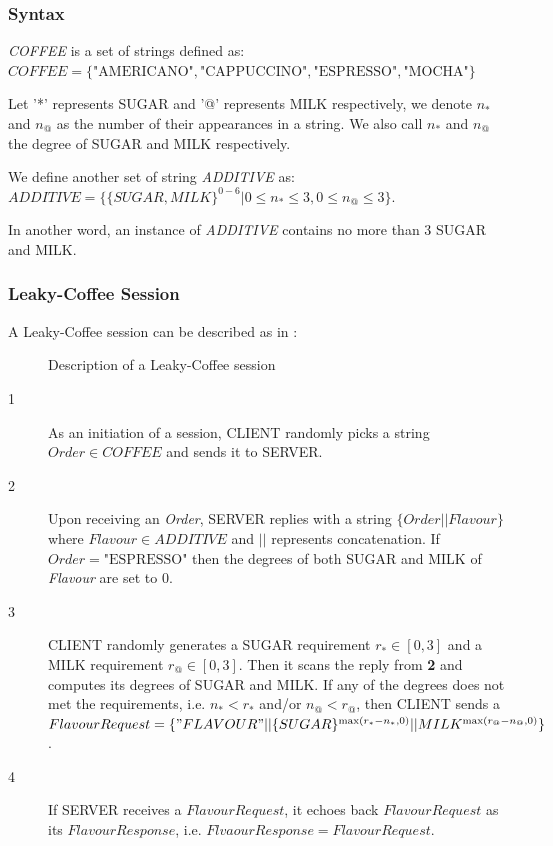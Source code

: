 \subsubsection{Syntax}
\begin{definition}
\textit{COFFEE} is a set of strings defined as:\\
 $COFFEE = \{  {\text{"AMERICANO"}}, \text{"CAPPUCCINO"}, \text{"ESPRESSO"}, \text{"MOCHA"}\}$
\end{definition}

\begin{definition}
Let '*' represents SUGAR and '@' represents MILK respectively, we denote $n_*$ and $n_@$ as the number of their appearances in a string. We also call $n_*$ and $n_@$ the degree of SUGAR and MILK respectively.
\end{definition}

\begin{definition}
We define another set of string \textit{ADDITIVE} as:\\
$ADDITIVE = \{\{ SUGAR, MILK \}^{0 - 6} | 0 \leq n_{*} \leq 3, 0 \leq n_{@} \leq 3 \}$.

In another word, an instance of \textit{ADDITIVE} contains no more than 3 SUGAR and MILK.
\end{definition}

\subsubsection{Leaky-Coffee Session}
A Leaky-Coffee session can be described as in :

\begin{figure}[H]
\centering
\resizebox{10cm}{!}
{}
\caption{Description of a Leaky-Coffee session}
\label{Fig: Leaky-Coffee Session}
\end{figure}

\begin{description}
\item[1] As an initiation of a session, CLIENT randomly picks a string $Order \in COFFEE$ and sends it to SERVER.

\item[2] Upon receiving an \textit{Order}, SERVER replies with a string $\{Order || Flavour\}$ where $Flavour \in ADDITIVE$ and $||$ represents concatenation. If $Order = \text{"ESPRESSO"}$ then the degrees of both SUGAR and MILK of \textit{Flavour} are set to $0$\label{ESPRESSO}.

\item[3] CLIENT randomly generates a SUGAR requirement $r_* \in [0, 3]$ and a MILK requirement $r_@ \in [0,3]$. Then it scans the reply from \textbf{2} and computes its degrees of SUGAR and MILK. If any of the degrees does not  met the requirements, i.e. $n_* < r_*$ and/or $n_@ < r_@$, then CLIENT sends a $ FlavourRequest = \{"FLAVOUR"||\{SUGAR\}^{\max({r_* - n_*,0})} || MILK^{\max(r_@ -  n_@, 0)} \} $.

\item[4] If SERVER receives a $FlavourRequest$, it echoes back $FlavourRequest$ as its $FlavourResponse$, i.e. $FlvaourResponse = FlavourRequest$.	
\end{description}

